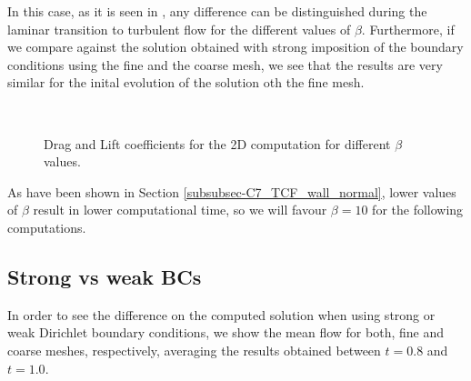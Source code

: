 In this case, as it is seen in , any difference can be distinguished during the laminar transition to turbulent flow for the different values of $ \beta $. Furthermore, if we compare against the solution obtained with strong imposition of the boundary conditions using the fine and the coarse mesh, we see that the results are very similar for the inital evolution of the solution oth the fine mesh. 
\begin{figure}[h!]
  \centering
  \\
  \caption{Drag and Lift coefficients for the 2D computation for different $ \beta $ values.}
  \label{fig-NACA_b_drag_lift}
\end{figure}
As have been shown in Section \ref{subsubsec-C7_TCF_wall_normal}, lower values of $ \beta $ result in lower computational time, so we will favour $ \beta=10 $ for the following computations.

\subsection{Strong vs weak BCs}
In order to see the difference on the computed solution when using strong or weak Dirichlet boundary conditions, we show the mean flow for both, fine and coarse meshes, respectively, averaging the results obtained between $ t=0.8 $ and $ t=1.0 $.

